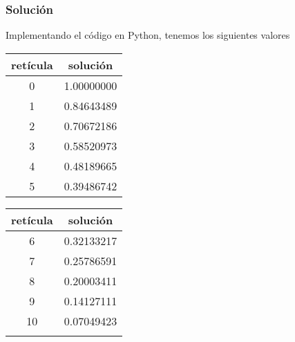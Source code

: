 \begin{frame}
\frametitle{Soluci\'{o}n}
Implementando el c\'{o}digo en Python, tenemos los siguientes valores
\\
\medskip
\begin{minipage}{4cm}
\begin{tabular}{c | c}
ret\'{i}cula & soluci\'{o}n \\ \hline
0 & 1.00000000 \\
1 & 0.84643489 \\
2 & 0.70672186 \\
3 & 0.58520973 \\
4 & 0.48189665 \\
5 & 0.39486742 \\
\end{tabular}
\end{minipage}
\hspace{0.5cm}
\begin{minipage}{4cm}
\begin{tabular}{c | c}
ret\'{i}cula & soluci\'{o}n \\ \hline
6 & 0.32133217 \\
7 & 0.25786591 \\
8 & 0.20003411 \\
9 & 0.14127111 \\
10 & 0.07049423 \\
 & 
\end{tabular}
\end{minipage}
\end{frame}
